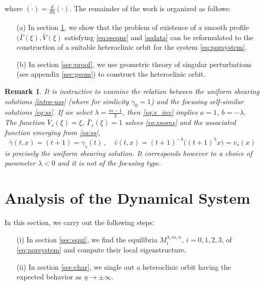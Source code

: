 \documentclass[a4paper,11pt]{article}
\def\bG{\bar{\Gamma}}
\def\bV{\bar{V}}
\newtheorem{remark}{Remark}[section]
\numberwithin{step}{dummy}
\begin{document}
{where $\dot{(\cdot)} = \frac{d}{d{\eta}}(\cdot)$}.
The remainder of the work is organized as follows:
\begin{itemize}
\item[(a)] In section \ref{sec:dyn}, we show that the problem of existence of  a smooth profile $(\bG(\xi), \bV(\xi)$ satisfying  \eqref{eq:sseqns} and \eqref{ssdata}
can be reformulated to the construction of a suitable heteroclinic orbit for the system \eqref{eq:pqrsystem}.
\item[(b)] In section \ref{sec:proof}, we use geometric theory of singular perturbations (see appendix \ref{sec:geom}) to construct the heteroclinic orbit.
\end{itemize}

\begin{remark}
It is instructive to examine the relation between the uniform shearing solutions \eqref{intro-uss} (where for simlicity $\gamma_0 = 1$) 
and the focusing self-similar solutions \eqref{eq:ss}. If we select $\lambda = \tfrac{m-1}{2}$, then \eqref{eq:s_inv} implies $a = 1$,  $b = -\lambda$.
The function $\bV_s (\xi) = \xi$, $\bG_s  (\xi ) = 1$ solves \eqref{eq:sseqns} and the associated function emerging from \eqref{eq:ss},
$$
\bar \gamma (t,x) = (t+1) = \gamma_s (t) \, , \quad \bar v(t,x) = (t+1)^{-\lambda} \big ( (t + 1)^\lambda x \big ) = v_s (x)
$$
is precisely the uniform shearing solution. It corresponds however to a choice of parameter $\lambda < 0$ and it is not
of the focusing type.
\end{remark}

\section{Analysis of the Dynamical System} \label{sec:dyn}

In this section, we carry out the following steps: 
\begin{enumerate}
 \item[(i)] In section \ref{sec:equi}, we find the equilibria $M_i^{\lambda,m,n}$, $i=0,1,2,3$, of \eqref{eq:pqrsystem} and compute their local eigenstructure.
 \item[(ii)] In section \ref{sec:char}, we single out a heteroclinic orbit having the expected behavior as $\eta \rightarrow \pm \infty$. 
\end{enumerate}
\end{document}
